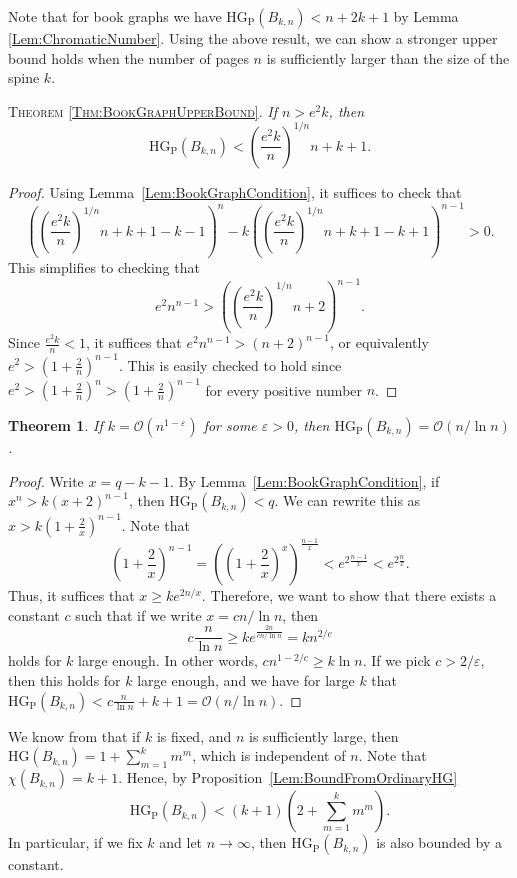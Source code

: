\documentclass[a4paper,11pt]{amsproc}
\theoremstyle{plain}
\newtheorem{Theorem} {Theorem} [section]
\theoremstyle{definition}
\newcommand{\HG}{{\mathrm{HG}}}
\newcommand{\HGP}{\mathrm{HG_{P}}}
\begin{document}
Note that for book graphs we have $\HGP(B_{k,n}) < n + 2k + 1$ by Lemma \ref{Lem:ChromaticNumber}. Using the above result, we can show a stronger upper bound holds when the number of pages $n$ is sufficiently larger than the size of the spine $k$.
\newline

{\scshape Theorem \ref{Thm:BookGraphUpperBound}.}
 {\it If $n > e^2 k$, then
 \[
  \HGP(B_{k,n}) < \left( \frac{e^2 k}{n} \right)^{1/n}n + k + 1.
 \]
}
\begin{proof}
 Using Lemma~\ref{Lem:BookGraphCondition}, it suffices to check that
 \[
  \left( \left( \frac{e^2 k}n \right)^{1/n} n + k + 1 - k -1 \right)^n - k \left( \left( \frac{e^2 k}n \right)^{1/n} n + k + 1 - k +1 \right)^{n-1} > 0.
 \]
 This simplifies to checking that
 \[
  e^2 n^{n-1} > \left( \left( \frac{ e^2 k}n \right)^{1/n} n + 2 \right)^{n-1}.
 \]
 Since $\frac{e^2 k}n < 1$, it suffices that $e^2 n^{n-1} > (n+2)^{n-1}$, or equivalently $e^2 > \left( 1 + \frac 2n \right)^{n-1}$.
 This is easily checked to hold since $e^2 > \left( 1 + \frac 2n \right)^n > \left( 1 + \frac 2n \right)^{n-1}$ for every positive number $n$.
\end{proof}

\begin{Theorem}
 \label{Thm:Book:2nd upper bound}
 If $k = \mathcal O(n^{1-\varepsilon})$ for some $\varepsilon > 0$, then $\HGP(B_{k,n}) = \mathcal O(n/\ln n)$.
\end{Theorem}

\begin{proof}
 Write $x = q - k -1$.
 By Lemma~\ref{Lem:BookGraphCondition}, if $x^n > k (x + 2)^{n-1}$, then $\HGP(B_{k,n}) < q$.
 We can rewrite this as $x > k \left( 1 + \frac 2x \right)^{n-1}$.
 Note that
 \[
  \left( 1 + \frac 2x \right)^{n-1}
  = \left( \left( 1 + \frac 2x \right)^x \right)^\frac{n-1}x
  < e^{2\frac{n-1}x} < e^{2\frac nx}.
 \]
 Thus, it suffices that $x \geq k e^{2n/x}$.
 Therefore, we want to show that there exists a constant $c$ such that if we write $x = c n / \ln n$, then
 \[
  c \frac n {\ln n} \geq k e^\frac{2n}{c n / \ln n} = k n^{2/c}
 \]
 holds for $k$ large enough.
 In other words, $c n^{1 - 2/c} \geq k \ln n$.
 If we pick $c > 2 / \varepsilon$, then this holds for $k$ large enough, and we have for large $k$ that $\HGP(B_{k,n}) < c \frac n {\ln n} + k + 1 = \mathcal O(n / \ln n)$.
\end{proof}

We know from \cite[Theorem 1.2]{He2022} that if $k$ is fixed, and $n$ is sufficiently large, then $\HG(B_{k,n}) = 1 + \sum_{m=1}^k m^m$, which is independent of $n$.
Note that $\chi(B_{k,n}) = k+1$.
Hence, by Proposition~\ref{Lem:BoundFromOrdinaryHG}
\[
 \HGP(B_{k,n}) < (k+1)\left( 2 + \sum_{m=1}^k m ^m \right).
\]
In particular, if we fix $k$ and let $n \to \infty$, then $\HGP(B_{k,n})$ is also bounded by a constant.
\end{document}
